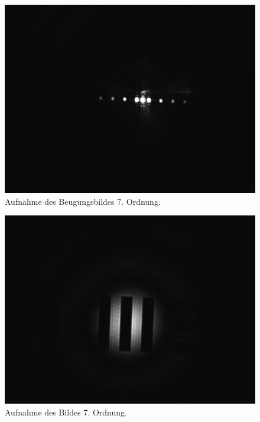 \documentclass{article}
\begin{document}
\begin{minipage}[t]{.45\textwidth}
\begin{figure}[H]
\includegraphics[scale=0.1]{tm/Beugungsbild_7.jpg}
\caption{Aufnahme des Beugungsbildes 7. Ordnung.}
\label{fig:bbild_7_tm}
\end{figure}
\end{minipage}
\hfill
\noindent
\begin{minipage}[t]{.45\textwidth}
\begin{figure}[H]
\includegraphics[scale=0.1]{tm/Bild_7.jpg}
\caption{Aufnahme des Bildes 7. Ordnung.}
\label{fig:bild_7_tm}
\end{figure}
\end{minipage}
\end{document}
